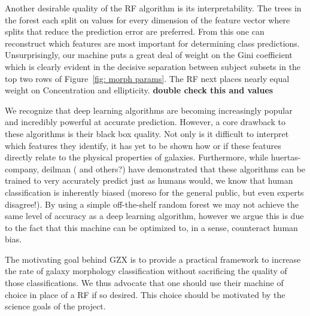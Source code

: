 \documentclass[twocolumn]{aastex6}
\begin{document}
Another desirable quality of the RF algorithm is its interpretability. The trees 
in the forest each split on values for every dimension of the feature vector where
 splits that reduce the prediction error are preferred. From this 
one can reconstruct which features are most important for determining class predictions. 
Unsurprisingly, our machine puts a great deal of weight on the Gini coefficient 
which is clearly evident in the decisive separation between subject subsets 
 in the top two rows of Figure~\ref{fig: morph params}. The RF next places nearly
equal weight on Concentration and ellipticity.  \textbf{double check this and values}

We recognize that deep learning algorithms are becoming increasingly popular
and incredibly powerful at accurate prediction. However, a core drawback to these
algorithms is their black box quality. Not only is it difficult to interpret which features they
identify, it has yet to be shown how or if these features directly relate to the physical
 properties of galaxies. Furthermore, while huertas-company, deilman ( and others?) have demonstrated
that these algorithms can be trained to very accurately predict just as humans would, 
we know that human classification is inherently biased (moreso for the general public, 
but even experts disagree!). By using a simple off-the-shelf random forest we may 
not achieve the same level of accuracy as a deep learning algorithm, however we argue
this is due to the fact that this machine can be optimized to, in a sense, counteract human bias. 

The motivating goal behind GZX is to provide a practical framework to increase the rate
of galaxy morphology classification without sacrificing the quality of those classifications.
We thus advocate that one should use their machine of choice in place of a RF if so 
desired. This choice should be motivated by the science goals of the project. 

\end{document}
